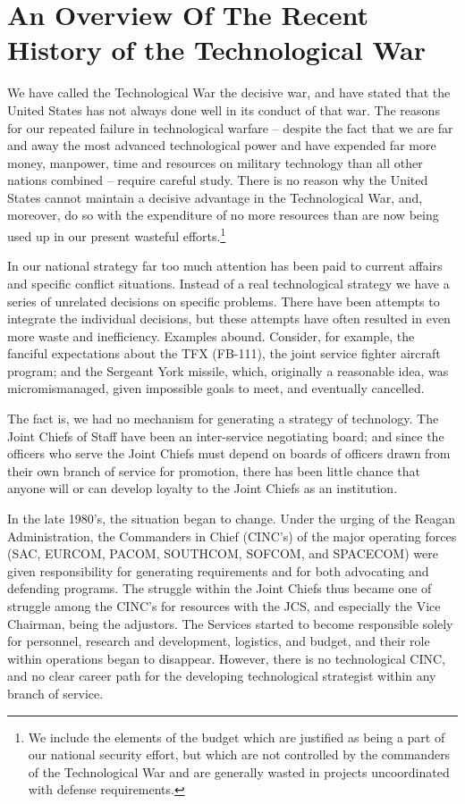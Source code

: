 \chapter{An Overview Of The Recent History of the Technological War}

We have called the Technological War the decisive war, and have stated that the United States has not always done well in its conduct of that war. The reasons for our repeated failure in technological warfare -- despite the fact that we are far and away the most advanced technological power and have expended far more money, manpower, time and resources on military technology than all other nations combined -- require careful study. There is no reason why the United States cannot maintain a decisive advantage in the Technological War, and, moreover, do so with the expenditure of no more resources than are now being used up in our present wasteful efforts.\footnote{
We include the elements of the budget which are justified as being a part of our national security effort, but which are not controlled by the commanders of the Technological War and are generally wasted in projects uncoordinated with defense requirements.
}

In our national strategy far too much attention has been paid to current affairs and specific conflict situations. Instead of a real technological strategy we have a series of unrelated decisions on specific problems. There have been attempts to integrate the individual decisions, but these attempts have often resulted in even more waste and inefficiency. Examples abound. Consider, for example, the fanciful expectations about the TFX (FB-111), the joint service fighter aircraft program; and the Sergeant York missile, which, originally a reasonable idea, was micromismanaged, given impossible goals to meet, and eventually cancelled.

The fact is, we had no mechanism for generating a strategy of technology. The Joint Chiefs of Staff have been an inter-service negotiating board; and since the officers who serve the Joint Chiefs must depend on boards of officers drawn from their own branch of service for promotion, there has been little chance that anyone will or can develop loyalty to the Joint Chiefs as an institution.

In the late 1980's, the situation began to change. Under the urging of the Reagan Administration, the Commanders in Chief (CINC's) of the major operating forces (SAC, EURCOM, PACOM, SOUTHCOM, SOFCOM, and SPACECOM) were given responsibility for generating requirements and for both advocating and defending programs. The struggle within the Joint Chiefs thus became one of struggle among the CINC's for resources with the JCS, and especially the Vice Chairman, being the adjustors. The Services started to become responsible solely for personnel, research and development, logistics, and budget, and their role within operations began to disappear. However, there is no technological CINC, and no clear career path for the developing technological strategist within any branch of service.

